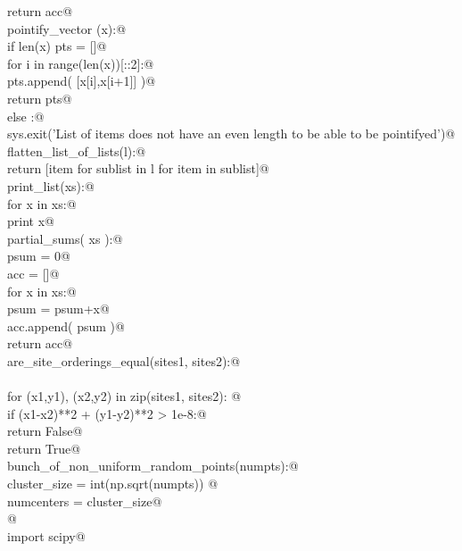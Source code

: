 \documentclass[12pt, english, oneside]{report}
\begin{document}
\begin{appendices}
\begin{flushleft}
\begin{list}{}{}
\mbox{}\verb@    return acc@\\
\mbox{}\verb@def pointify_vector (x):@\\
\mbox{}\verb@    if len(x) % 2 == 0:@\\
\mbox{}\verb@        pts = []@\\
\mbox{}\verb@        for i in range(len(x))[::2]:@\\
\mbox{}\verb@            pts.append( [x[i],x[i+1]] )@\\
\mbox{}\verb@        return pts@\\
\mbox{}\verb@    else :@\\
\mbox{}\verb@        sys.exit('List of items does not have an even length to be able to be pointifyed')@\\
\mbox{}\verb@def flatten_list_of_lists(l):@\\
\mbox{}\verb@       return [item for sublist in l for item in sublist]@\\
\mbox{}\verb@def print_list(xs):@\\
\mbox{}\verb@    for x in xs:@\\
\mbox{}\verb@        print x@\\
\mbox{}\verb@def partial_sums( xs ):@\\
\mbox{}\verb@    psum = 0@\\
\mbox{}\verb@    acc = []@\\
\mbox{}\verb@    for x in xs:@\\
\mbox{}\verb@        psum = psum+x@\\
\mbox{}\verb@        acc.append( psum )@\\
\mbox{}\verb@    return acc@\\
\mbox{}\verb@def are_site_orderings_equal(sites1, sites2):@\\
\mbox{}\verb@@\\
\mbox{}\verb@    for (x1,y1), (x2,y2) in zip(sites1, sites2): @\\
\mbox{}\verb@        if (x1-x2)**2 + (y1-y2)**2 > 1e-8:@\\
\mbox{}\verb@            return False@\\
\mbox{}\verb@    return True@\\
\mbox{}\verb@def bunch_of_non_uniform_random_points(numpts):@\\
\mbox{}\verb@    cluster_size = int(np.sqrt(numpts)) @\\
\mbox{}\verb@    numcenters   = cluster_size@\\
\mbox{}\verb@    @\\
\mbox{}\verb@    import scipy@\\

\end{list}
\end{flushleft}
\end{appendices}
\end{document}
